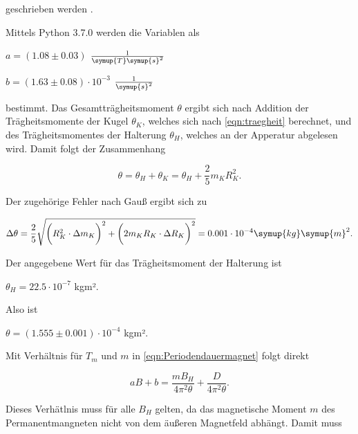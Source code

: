 geschrieben werden \cite[14]{fehlerrechnung}.

Mittels Python 3.7.0 werden die Variablen als

\vspace{.5em}
\centerline{$a = (1.08 \pm 0.03)$ $\frac{1}{\symup{T} \symup{s}^2}$}

\centerline{$b = (1.63 \pm 0.08) \cdot 10^{-3}$ $\frac{1}{\symup{s}^2}$}
\vspace{.5em}

bestimmt. Das Gesamtträgheitsmoment $\theta$ ergibt sich nach Addition der Trägheitsmomente der Kugel $\theta_K$, welches sich nach \eqref{eqn:traegheit} berechnet, und des Trägheitsmomentes der Halterung $\theta_H$, welches an der Apperatur abgelesen wird.
Damit folgt der Zusammenhang

\begin{equation}
  \theta = \theta_H + \theta_K = \theta_H + \frac {2}{5} m_K R_K^{2}.
\end{equation}

Der zugehörige Fehler nach Gauß ergibt sich zu

\begin{equation}
  \Delta \theta = \frac{2}{5} \sqrt{ \bigg( R_K^2 \cdot \Delta m_K \bigg)^2 + \bigg( 2m_K R_K \cdot \Delta R_K \bigg)^2 } = 0.001 \cdot 10^{-4} \symup{kg} \symup{m}^2.
\end{equation}

Der angegebene Wert für das Trägheitsmoment der Halterung ist

\vspace{.5em}
\centerline{$\theta_H = 22.5 \cdot 10^{-7}$ kgm².}
\vspace{.5em}

Also ist

\vspace{.5em}
\centerline{$\theta = (1.555 \pm 0.001) \cdot 10^{-4}$ kgm².}
\vspace{.5em}

Mit Verhältnis für $T_m$ und $m$ in \eqref{eqn:Periodendauermagnet} folgt direkt

\begin{equation}
  aB + b = \frac{mB_H}{4 \pi^2 \theta} + \frac{D}{4 \pi^2 \theta}.
\end{equation}

Dieses Verhätlnis muss für alle $B_H$ gelten, da das magnetische Moment $m$ des Permanentmangneten nicht von dem äußeren Magnetfeld abhängt.
Damit muss

